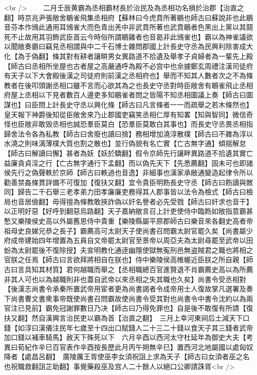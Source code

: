 <br />
　　二月壬辰黄霸為丞相霸材長於治民及為丞相功名損於治郡【治直之翻】時京兆尹張敞舍鶡雀飛集丞相府【蘇林曰今虎賁所著鶡也師古曰蘇說非也此鶡音芬本作鳻此通用耳鳻雀大而色青出羌中非武賁所著也武賁鶡者色黑出上黨以其鬪死不止故用其羽飾武臣首云今時俗所謂鶡雞者也音曷非此鳻雀也】霸以為神雀議欲以聞敞奏霸曰竊見丞相謂與中二千石博士雜問郡國上計長史守丞為民興利除害成大化【為于偽翻】條其對有耕者讓畊男女異路道不拾遺及舉孝子貞婦者為一輩先上殿【師古曰丞相所坐屋也古者屋之高嚴通呼為殿不必宫中也余據鄭玄周禮注漢司徒府有天子以下大會殿後漢之司徒府則前漢之丞相府也】舉而不知其人數者次之不為條教者在後叩頭謝丞相口雖不言而心欲其為之也長史守丞對時臣敞舍有鶡雀飛止丞相府屋上丞相以下見者數百人邊吏多知鶡雀者問之皆陽不知丞相圖議上奏【師古曰圖謀也】曰臣問上計長史守丞以興化條【師古曰凡言條者一一而疏舉之若木條然也】皇天報下神爵後知從臣敞舍來乃止郡國吏竊笑丞相仁厚有知畧【知與智同】微信奇怪也臣敞非敢毁丞相也誠恐羣臣莫白【恐羣臣莫敢白其事也】而長史守丞畏丞相指歸舍法令各為私教【師古曰舍廢也讀曰捨】務相增加澆淳散樸【師古曰不雜為淳以水澆之則味漓薄樸大質也割之散也】並行偽貌有名亡實【亡古無字通】傾揺解怠【師古曰解讀曰懈】甚者為妖【妖於驕翻】假令京師先行讓畔異路道不拾遺其實亡益廉貪貞淫之行【亡古無字通行下孟翻】而以偽先天下【先悉薦翻】固未可也即諸侯先行之偽聲軼於京師【師古曰軼過也音逸】非細事也漢家承敝通變造起律令所以勸善禁姦條貫詳備不可復加【復扶又翻】宜令貴臣明飭長史守丞【師古曰飭讀與敇同】歸告二千石舉三老孝弟力田孝廉廉吏務得其人郡事皆以法令為檢式【師古曰檢局也音居儉翻】毋得擅為條教敢挾詐偽以奸名譽者必先受戮【師古曰奸求也音干】以正明好惡【好呼到翻惡烏路翻】天子嘉納敞言召上計吏使侍中臨飭如敞指意霸甚慙又樂陵侯史高以外屬舊恩侍中貴重【樂陵縣屬平原郡師古曰樂音來各翻史高者帝祖母史良娣兄恭之長子】霸薦高可太尉天子使尚書召問霸太尉官罷久矣【尚書屬少府成帝建始四年增置為五員自文帝罷太尉官至景帝以周亞夫為太尉尋罷至武帝以田蚡為太尉罷後不復除授】夫宣明教化通逹幽隱使獄無寃刑邑無盗賊君之職也將相之官朕之任焉【師古曰言欲拜將相自在朕也】侍中樂陵侯高帷幄近臣朕之所自親【師古曰言具知其材質】君何越職而舉之【丞相職總百官進賢退不肖霸薦史高以為所薦非其人可也以為越職則非也蓋自武帝以來丞相之失其職也久矣】尚書令受丞相對【後漢志尚書令承秦所置武帝用宦者更為尚書謁者令成帝用士人復故掌凡選署及奏下尚書曹文書衆事帝既使尚書召問霸故使尚書令受其對也尚書令中書令沈約以為兩官注已見前】霸免冠謝罪數日乃决【師古曰乃得免罪也】自是後不敢復有所請【復扶又翻】然自漢興言治民吏以霸為首【治直之翻】　三月上幸河東祠后土減天下口錢【如淳曰漢儀注民年七歲至十四出口賦錢人二十三二十錢以食天子其三錢者武帝加口錢以補車騎馬】赦天下殊死以下　六月辛酉以西河太守杜延年為御史大夫【考異曰荀紀作辛巳百官表作辛酉按長歷此月丙午朔無辛巳】置西河北地屬國以處匈奴降者【處昌呂翻】　廣陵厲王胥使巫李女須祝詛上求為天子【師古曰女須者巫之名也祝職救翻詛芷助翻】事覺藥殺巫及宫人二十餘人以絕口公卿請誅胥<br />
